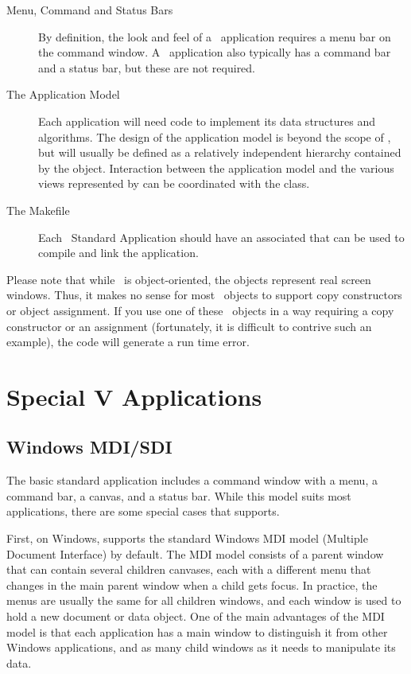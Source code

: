 \begin{description}
\item [Menu, Command and Status Bars]

By definition, the look and feel of a \V\ application requires
a menu bar on the command window. A \V\ application also typically
has a command bar and a status bar, but these are not required.

\item [The Application Model]

Each application will need code to implement its data structures
and algorithms. The design of the application model is beyond the
scope of \V, but will usually be defined as a relatively
independent hierarchy contained by the  object.
Interaction between the application model and the various
views represented by  can be coordinated with
the  class.

\item [The Makefile]

Each \V\ Standard Application should have an associated 
that can be used to compile and link the application.

\end{description}

Please note that while \V\ is object-oriented, the objects
represent real screen windows. Thus, it makes no sense for most
\V\ objects to support copy constructors or object assignment. If
you use one of these \V\ objects in a way requiring a copy
constructor or an assignment (fortunately, it is difficult to
contrive such an example), the code will generate a run time
error.

\section{Special V Applications}

\subsection*{Windows MDI/SDI}

The basic standard \V application includes a command window
with a menu, a command bar, a canvas, and a status bar. While
this model suits most applications, there are some special
cases that \V supports.

First, on Windows, \V supports the standard Windows MDI model
(Multiple Document Interface)
by default. The MDI model consists of a parent window that
can contain several children canvases, each with a different
menu that changes in the main parent window when a child
gets focus. In practice, the menus are usually the same for
all children windows, and each window is used to hold a
new document or data object. One of the main advantages
of the MDI model is that each application has a main window
to distinguish it from other Windows applications, and
as many child windows as it needs to manipulate its data.

